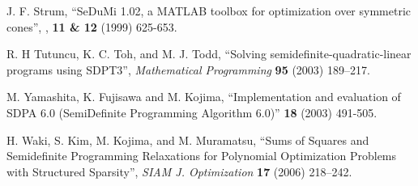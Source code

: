 \begin{thebibliography}{10}

J. F. Strum,
\newblock ``SeDuMi 1.02, a MATLAB toolbox for optimization over symmetric cones'',
, {\bf 11 \& 12} (1999)  625-653.

\newblock R. H Tutuncu, K. C. Toh, and M. J. Todd, 
``Solving semidefinite-quadratic-linear programs using SDPT3'', 
{\em Mathematical Programming} {\bf 95}  (2003) 189--217. 

M. Yamashita, K. Fujisawa and M. Kojima,
\newblock ``Implementation and evaluation of SDPA 6.0 (SemiDefinite
Programming Algorithm 6.0)'' 
  {\bf 18} (2003)  491-505.

H. Waki, S. Kim, M. Kojima, and M. Muramatsu,
``Sums of Squares and Semidefinite Programming Relaxations
for  Polynomial Optimization Problems
with Structured Sparsity'', 
{\em SIAM J. Optimization} {\bf 17} (2006) 218--242.


\end{thebibliography}

 
